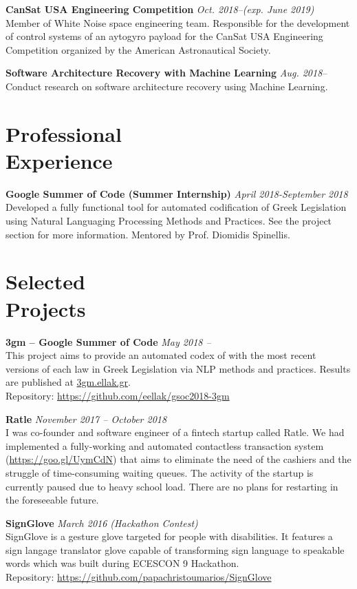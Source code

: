 \documentclass[margin]{res}
\newcommand{\field}[2]{\noindent \textbf{#1} \hfill #2 \\}
\begin{document}
\begin{resume}
\field{CanSat USA Engineering Competition} {\emph{Oct. 2018--(exp. June 2019)}}
Member of White Noise space engineering team. Responsible for the development of control systems of an aytogyro payload for the CanSat USA Engineering Competition organized by the American Astronautical Society. 

\field{Software Architecture Recovery with Machine Learning} {\emph{Aug. 2018--}}
Conduct research on software architecture recovery using Machine Learning. 
    

\section{Professional \\ Experience}
\field{Google Summer of Code (Summer Internship)}  {\emph{April 2018-September 2018}}
Developed a fully functional tool for automated codification of Greek Legislation using Natural Languaging Processing Methods and Practices. See the project section for more information. Mentored by Prof. Diomidis Spinellis. 

\section{Selected \\ Projects} 

\field{3gm -- Google Summer of Code} {\emph{May 2018 -- }}
This project aims to provide an automated codex of with the most recent versions of each law in Greek Legislation via NLP methods and practices. Results are published at \url{3gm.ellak.gr}. \\ Repository: \url{https://github.com/eellak/gsoc2018-3gm}

\field{Ratle} {\emph{November 2017 -- October 2018}}
I was co-founder and software engineer of a fintech startup called Ratle. We had implemented a fully-working and automated contactless transaction system (\url{https://goo.gl/UymCdN}) that aims to eliminate the need of the cashiers and the struggle of time-consuming waiting queues. The activity of the startup is currently paused due to heavy school load. There are
no plans for restarting in the foreseeable future.

\field{SignGlove} {\emph{March 2016 (Hackathon Contest)}}
SignGlove is a gesture glove targeted for people with disabilities. It features a sign langage translator glove capable of transforming sign language to speakable words which was built during ECESCON 9 Hackathon. \\ Repository: \url{https://github.com/papachristoumarios/SignGlove}


\end{resume}
\end{document}
